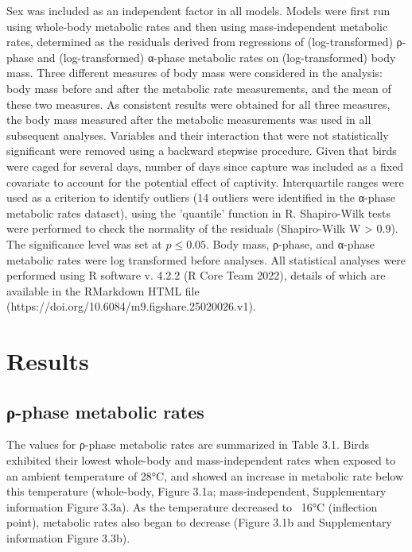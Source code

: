 \documentclass[10pt, twoside]{book} %
\begin{document}
Sex was included as an independent factor in all models. Models were first run using whole-body metabolic rates and then using mass-independent metabolic rates, determined as the residuals derived from regressions of (log-transformed) ρ-phase and (log-transformed) α-phase metabolic rates on (log-transformed) body mass. Three different measures of body mass were considered in the analysis: body mass before and after the metabolic rate measurements, and the mean of these two measures. As consistent results were obtained for all three measures, the body mass measured after the metabolic measurements was used in all subsequent analyses. Variables and their interaction that were not statistically significant were removed using a backward stepwise procedure. Given that birds were caged for several days, number of days since capture was included as a fixed covariate to account for the potential effect of captivity. Interquartile ranges were used as a criterion to identify outliers (14 outliers were identified in the α-phase metabolic rates dataset), using the 'quantile' function in R. Shapiro-Wilk tests were performed to check the normality of the residuals (Shapiro-Wilk W > 0.9). The significance level was set at $p \leq 0.05$. Body mass, ρ-phase, and α-phase metabolic rates were log transformed before analyses. All statistical analyses were performed using R software v. 4.2.2 (R Core Team 2022), details of which are available in the RMarkdown HTML file (https://doi.org/10.6084/m9.figshare.25020026.v1).\\

\section{Results}

\subsection{ρ-phase metabolic rates}
The values for ρ-phase metabolic rates are summarized in Table 3.1. Birds exhibited their lowest whole-body and mass-independent rates when exposed to an ambient temperature of 28°C, and showed an increase in metabolic rate below this temperature (whole-body, Figure 3.1a; mass-independent, Supplementary information Figure 3.3a). As the temperature decreased to ~16°C (inflection point), metabolic rates also began to decrease (Figure 3.1b and Supplementary information Figure 3.3b).\\
\end{document}
